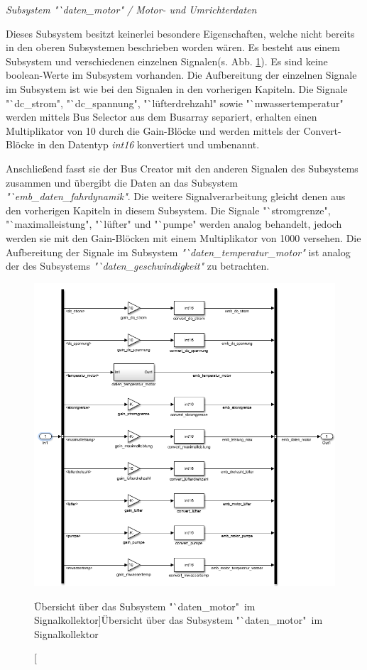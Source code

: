 \documentclass[fontsize = 12pt, paper = a4]{scrreprt}
\begin{document}

\textit {Subsystem "`daten\_motor" / Motor- und Umrichterdaten}

Dieses Subsystem besitzt keinerlei besondere Eigenschaften, welche nicht bereits in den oberen Subsystemen beschrieben worden wären. Es besteht aus einem Subsystem und verschiedenen einzelnen Signalen(s. Abb. \ref{scdatenmotor}). Es sind keine boolean-Werte im Subsystem vorhanden. Die Aufbereitung der einzelnen Signale im Subsystem ist wie bei den Signalen in den vorherigen Kapiteln. Die Signale "`dc\_strom", "`dc\_spannung", "`lüfterdrehzahl" sowie "`mwassertemperatur" werden mittels Bus Selector aus dem Busarray separiert, erhalten einen Multiplikator von 10 durch die Gain-Blöcke und werden mittels der Convert-Blöcke in den Datentyp \textit{int16} konvertiert und umbenannt.

\newpage

Anschließend fasst sie der Bus Creator mit den anderen Signalen des Subsystems zusammen und übergibt die Daten an das Subsystem \textit{"`emb\_daten\_fahrdynamik"}. Die weitere Signalverarbeitung gleicht denen aus den vorherigen Kapiteln in diesem Subsystem. Die Signale "`stromgrenze", "`maximalleistung", "`lüfter" und "`pumpe" werden analog behandelt, jedoch werden sie mit den Gain-Blöcken mit einem Multiplikator von 1000 versehen. Die Aufbereitung der Signale im Subsystem \textit{"`daten\_temperatur\_motor" }ist analog der des Subsystems \textit{"`daten\_geschwindigkeit"} zu betrachten.
 
\begin{figure}[h]
\centering
\includegraphics[scale = 0.75]{sc_daten_motor}
\caption[Übersicht über das Subsystem "`daten\_motor"\ im Signalkollektor]{Übersicht über das Subsystem "`daten\_motor"\ im Signalkollektor}
\label{scdatenmotor}
\end{figure} 
\end{document}
